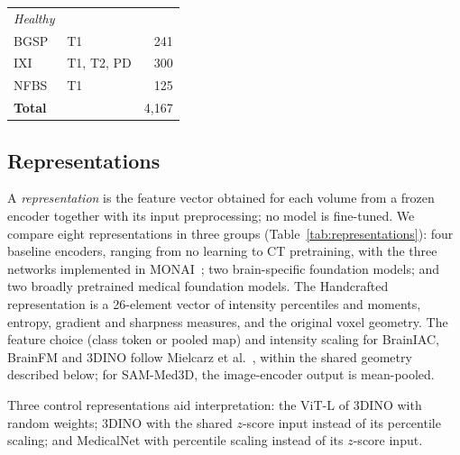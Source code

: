 \documentclass[11pt]{article}
\begin{document}
\begin{table}[t]
\begin{tabular}{llr}
\midrule
\multicolumn{3}{l}{\textit{Healthy}} \\
BGSP~\cite{buckner_brain_2014}                                   & T1 & 241 \\
IXI~\cite{noauthor_ixi_nodate}                                   & T1, T2, PD & 300 \\
NFBS~\cite{puccio_preprocessed_2016}                             & T1 & 125 \\
\midrule
\textbf{Total}                                                   & & 4{,}167 \\
\bottomrule
\end{tabular}
\end{table}

\subsection{Representations}

A \emph{representation} is the feature vector obtained for each volume from a
frozen encoder together with its input preprocessing; no model is
fine-tuned. We compare eight representations in three groups
(Table~\ref{tab:representations}): four baseline encoders, ranging from no
learning to CT pretraining, with the three networks implemented in
MONAI~\cite{cardoso_monai_2022}; two brain-specific foundation models; and
two broadly pretrained medical foundation models. The Handcrafted
representation is a 26-element vector of intensity percentiles and moments,
entropy, gradient and sharpness measures, and the original voxel geometry.
The feature choice (class token or pooled map) and intensity scaling for
BrainIAC, BrainFM and 3DINO follow Mielcarz et al.~\cite{mielcarz_3d_2026},
within the shared geometry described below; for SAM-Med3D, the image-encoder output is
mean-pooled.

Three control representations aid interpretation: the ViT-L of 3DINO with
random weights; 3DINO with the shared $z$-score input instead of its
percentile scaling; and MedicalNet with percentile scaling instead of its
$z$-score input.
\end{document}
